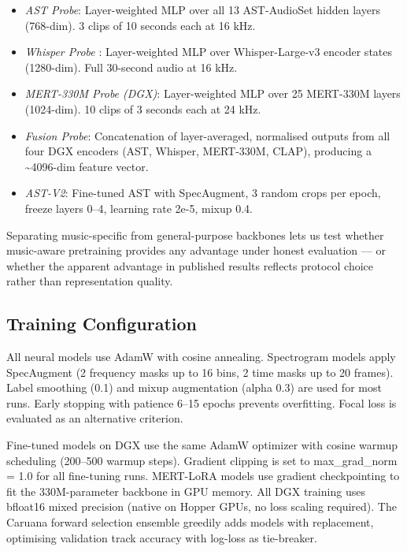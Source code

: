 \documentclass[conference]{IEEEtran}
\providecommand{\tightlist}{\setlength{\itemsep}{0pt}\setlength{\parskip}{0pt}}
\begin{document}
\begin{itemize}
\tightlist
\item
  \emph{AST Probe}: Layer-weighted MLP over all 13 AST-AudioSet hidden
  layers (768-dim). 3 clips of 10 seconds each at 16 kHz.
\item
  \emph{Whisper Probe} \citep{radford2023whisper}: Layer-weighted MLP
  over Whisper-Large-v3 encoder states (1280-dim). Full 30-second audio
  at 16 kHz.
\item
  \emph{MERT-330M Probe (DGX)}: Layer-weighted MLP over 25 MERT-330M
  layers (1024-dim). 10 clips of 3 seconds each at 24 kHz.
\item
  \emph{Fusion Probe}: Concatenation of layer-averaged, normalised
  outputs from all four DGX encoders (AST, Whisper, MERT-330M, CLAP),
  producing a \textasciitilde4096-dim feature vector.
\item
  \emph{AST-V2}: Fine-tuned AST with SpecAugment, 3 random crops per
  epoch, freeze layers 0--4, learning rate 2e-5, mixup 0.4.
\end{itemize}

Separating music-specific from general-purpose backbones lets us test
whether music-aware pretraining provides any advantage under honest
evaluation --- or whether the apparent advantage in published
results reflects protocol choice rather than representation quality.

\subsection{Training Configuration}\label{f.-training-configuration}

All neural models use AdamW \citep{loshchilov2019adamw} with cosine
annealing. Spectrogram models apply SpecAugment
\citep{park2019specaugment} (2 frequency masks up to 16 bins, 2 time
masks up to 20 frames). Label smoothing (0.1)
\citep{szegedy2016rethinking} and mixup augmentation (alpha 0.3)
\citep{zhang2018mixup} are used for most runs. Early stopping with
patience 6--15 epochs prevents overfitting. Focal loss
\citep{lin2017focal} is evaluated as an alternative criterion.

Fine-tuned models on DGX use the same AdamW optimizer with cosine warmup
scheduling (200--500 warmup steps). Gradient clipping is set to
max\_grad\_norm = 1.0 for all fine-tuning runs. MERT-LoRA models use
gradient checkpointing to fit the 330M-parameter backbone in GPU memory.
All DGX training uses bfloat16 mixed precision (native on Hopper GPUs,
no loss scaling required). The Caruana forward selection ensemble
\citep{kittler1998combining} greedily adds models with replacement,
optimising validation track accuracy with log-loss as tie-breaker.
\end{document}
